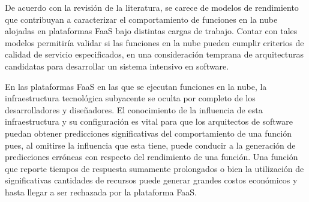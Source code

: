 De acuerdo con la revisión de la literatura, se carece de modelos de rendimiento que contribuyan a caracterizar el comportamiento de funciones en la nube alojadas en plataformas FaaS bajo distintas cargas de trabajo. Contar con tales modelos permitiría validar si las funciones en la nube pueden cumplir criterios de calidad de servicio especificados, en una consideración temprana de arquitecturas candidatas para desarrollar un sistema intensivo en software.

En las plataformas FaaS en las que se ejecutan funciones en la nube, la infraestructura tecnológica subyacente se oculta por completo de los desarrolladores y diseñadores. El conocimiento de la influencia de esta infraestructura y su configuración es vital para que los arquitectos de software puedan obtener predicciones significativas del comportamiento de una función pues, al omitirse la influencia que esta tiene, puede conducir a la generación de predicciones erróneas con respecto del rendimiento de una función. Una función que reporte tiempos de respuesta sumamente prolongados o bien la utilización de significativas cantidades de recursos puede generar grandes costos económicos y hasta llegar a ser rechazada por la plataforma FaaS.